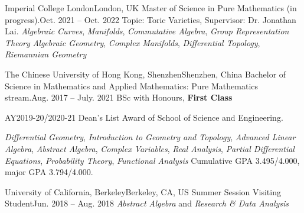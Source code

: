 \resumeSubHeadingListStart
	\resumeSubheading
		{Imperial College London}{London, UK}
		{Master of Science in Pure Mathematics (in progress).}{Oct. 2021 -- Oct. 2022}
		\resumeItemListStart
				{Topic: Toric Varieties, Supervisor: Dr. Jonathan Lai.}{}
				{\textit{Algebraic Curves}, \textit{Manifolds}, \textit{Commutative Algebra}, \textit{Group Representation Theory}}
				{\textit{Algebraic Geometry}, \textit{Complex Manifolds}, \textit{Differential Topology}, \textit{Riemannian Geometry}}
		\resumeItemListEnd

	\resumeSubheading
		{The Chinese University of Hong Kong, Shenzhen}{Shenzhen, China}
		{Bachelor of Science in Mathematics and Applied Mathematics: Pure Mathematics stream.}{Aug. 2017 -- July. 2021}
		\resumeItemListStart
				{BSc with Honours, \textbf{First Class}}
				{AY2019-20/2020-21 Dean's List Award of School of Science and Engineering. \par}
				{\textit{Differential Geometry}, \textit{Introduction to Geometry and Topology}, \textit{Advanced Linear Algebra}, \textit{Abstract Algebra}, \textit{Complex Variables}, \textit{Real Analysis}, \textit{Partial Differential Equations}, \textit{Probability Theory}, \textit{Functional Analysis}}
				{Cumulative GPA 3.495/4.000, major GPA 3.794/4.000.}
		\resumeItemListEnd
		

	\resumeSubheading
		{University of California, Berkeley}{Berkeley, CA, US}
		{Summer Session Visiting Student}{Jun. 2018 -- Aug. 2018}
		\resumeItemListStart
				{\textit{Abstract Algebra} and \textit{Research \& Data Analysis}}
		\resumeItemListEnd
		
\resumeSubHeadingListEnd
